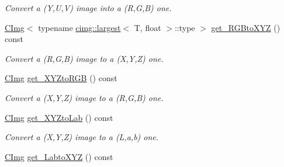 \begin{DoxyCompactItemize}
\begin{DoxyCompactList}\small\item\em Convert a (Y,U,V) image into a (R,G,B) one. \item\end{DoxyCompactList}\item 
\hypertarget{structcimg__library_1_1_c_img_a9ddeade34f355b48cd563fd3afe5f8bf}{
\hyperlink{structcimg__library_1_1_c_img}{CImg}$<$ typename \hyperlink{structcimg__library_1_1cimg_1_1largest}{cimg::largest}$<$ T, float $>$::type $>$ \hyperlink{structcimg__library_1_1_c_img_a9ddeade34f355b48cd563fd3afe5f8bf}{get\_\-RGBtoXYZ} () const }
\label{structcimg__library_1_1_c_img_a9ddeade34f355b48cd563fd3afe5f8bf}

\begin{DoxyCompactList}\small\item\em Convert a (R,G,B) image to a (X,Y,Z) one. \item\end{DoxyCompactList}\item 
\hypertarget{structcimg__library_1_1_c_img_a370c0942882e30cc1ab4078503cabc02}{
\hyperlink{structcimg__library_1_1_c_img}{CImg} \hyperlink{structcimg__library_1_1_c_img_a370c0942882e30cc1ab4078503cabc02}{get\_\-XYZtoRGB} () const }
\label{structcimg__library_1_1_c_img_a370c0942882e30cc1ab4078503cabc02}

\begin{DoxyCompactList}\small\item\em Convert a (X,Y,Z) image to a (R,G,B) one. \item\end{DoxyCompactList}\item 
\hypertarget{structcimg__library_1_1_c_img_ab6bf2a2a5e40c457a22b946a95522dd6}{
\hyperlink{structcimg__library_1_1_c_img}{CImg} \hyperlink{structcimg__library_1_1_c_img_ab6bf2a2a5e40c457a22b946a95522dd6}{get\_\-XYZtoLab} () const }
\label{structcimg__library_1_1_c_img_ab6bf2a2a5e40c457a22b946a95522dd6}

\begin{DoxyCompactList}\small\item\em Convert a (X,Y,Z) image to a (L,a,b) one. \item\end{DoxyCompactList}\item 
\hypertarget{structcimg__library_1_1_c_img_a30914eaf157ea70a4dbc56916c1d0886}{
\hyperlink{structcimg__library_1_1_c_img}{CImg} \hyperlink{structcimg__library_1_1_c_img_a30914eaf157ea70a4dbc56916c1d0886}{get\_\-LabtoXYZ} () const }
\label{structcimg__library_1_1_c_img_a30914eaf157ea70a4dbc56916c1d0886}


\end{DoxyCompactItemize}
